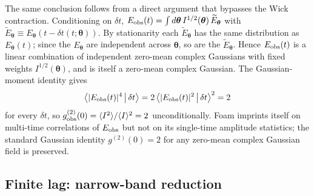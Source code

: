 \documentclass[aps,prd,onecolumn,amsmath,amssymb]{revtex4-2}
\begin{document}
The same conclusion follows from a direct argument that bypasses the
Wick contraction.  Conditioning on $\delta t$,
$E_{\rm obs}(t) = \int d\boldsymbol{\theta}\,I^{1/2}(\boldsymbol{\theta})\,
\widetilde E_{\boldsymbol{\theta}}$ with
$\widetilde E_{\boldsymbol{\theta}} \equiv
E_{\boldsymbol{\theta}}(t-\delta t(t;\boldsymbol{\theta}))$.  By
stationarity each $\widetilde E_{\boldsymbol{\theta}}$ has the same
distribution as $E_{\boldsymbol{\theta}}(t)$; since the $E_{\boldsymbol{\theta}}$
are independent across $\boldsymbol{\theta}$, so are the
$\widetilde E_{\boldsymbol{\theta}}$.  Hence $E_{\rm obs}(t)$ is a linear
combination of independent zero-mean complex Gaussians with fixed
weights $I^{1/2}(\boldsymbol{\theta})$, and is itself a zero-mean complex
Gaussian.  The Gaussian-moment identity gives
\begin{equation}
  \big\langle |E_{\rm obs}(t)|^4 \,\big|\, \delta t \big\rangle
  = 2\,\big\langle |E_{\rm obs}(t)|^2 \,\big|\, \delta t \big\rangle^2 = 2
\end{equation}
for every $\delta t$, so $g^{(2)}_{\rm obs}(0) = \langle I^2\rangle/\langle
I\rangle^2 = 2$ unconditionally.  Foam imprints itself on multi-time
correlations of $E_{\rm obs}$ but not on its single-time amplitude
statistics; the standard Gaussian identity $g^{(2)}(0)=2$ for any
zero-mean complex Gaussian field is preserved.

\subsection{Finite lag: narrow-band reduction}
\end{document}
